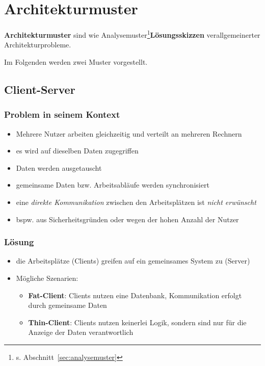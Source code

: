 \section{Architekturmuster}

\textbf{Architekturmuster} sind wie Analysemuster\footnote{
    s. Abschnitt~\ref{sec:analysemuster}
}\textbf{Lösungsskizzen} verallgemeinerter Architekturprobleme.

Im Folgenden werden zwei Muster vorgestellt.

\subsection{Client-Server}

\subsubsection*{Problem in seinem Kontext}
\begin{itemize}
    \item Mehrere Nutzer arbeiten gleichzeitig und verteilt an mehreren Rechnern
    \item es wird auf dieselben Daten zugegriffen
    \item Daten werden ausgetauscht
    \item gemeinsame Daten bzw. Arbeitsabläufe werden synchronisiert
    \item eine \textit{direkte Kommunikation} zwischen den Arbeitsplätzen ist \textit{nicht erwünscht}
    \item[] bspw. aus Sicherheitsgründen oder wegen der hohen Anzahl der Nutzer
\end{itemize}


\subsubsection*{Lösung}

\begin{itemize}
    \item die Arbeitsplätze (Clients) greifen auf ein gemeinsames System zu (Server)
    \item Mögliche Szenarien:
        \begin{itemize}
            \item \textbf{Fat-Client}: Clients nutzen eine Datenbank, Kommunikation erfolgt durch gemeinsame Daten
            \item \textbf{Thin-Client}: Clients nutzen keinerlei Logik, sondern sind nur für die Anzeige der Daten verantwortlich
        \end{itemize}
\end{itemize}

